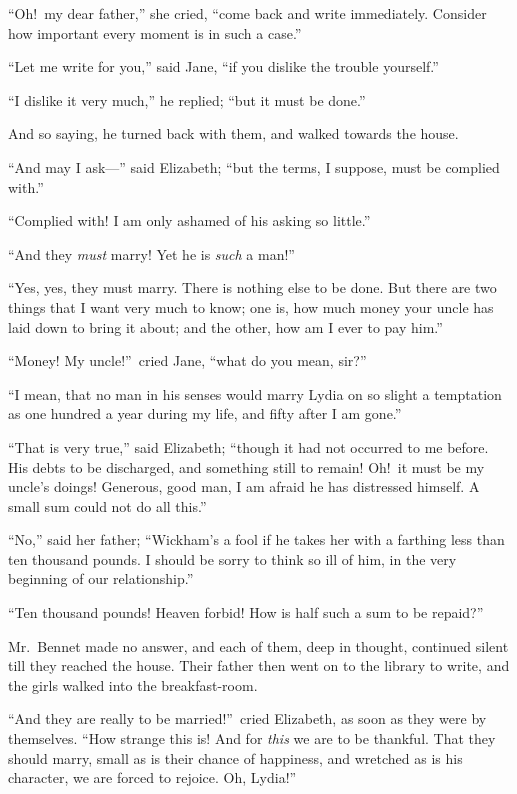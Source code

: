 \documentclass[12pt,english]{book}
\begin{document}
{}``Oh!\ my dear father,'' she cried, {}``come back and write
immediately. Consider how important every moment is in such a case.''

{}``Let me write for you,'' said Jane, {}``if you dislike the trouble
yourself.''

{}``I dislike it very much,'' he replied; {}``but it must be done.''

And so saying, he turned back with them, and walked towards the house.

{}``And may I ask\mbox{---}'' said Elizabeth; {}``but the terms,
I suppose, must be complied with.''

{}``Complied with! I am only ashamed of his asking so little.''

{}``And they \textit{must} marry! Yet he is \textit{such} a man!''\ 

{}``Yes, yes, they must marry. There is nothing else to be done.
But there are two things that I want very much to know; one is, how
much money your uncle has laid down to bring it about; and the other,
how am I ever to pay him.''

{}``Money! My uncle!''\ cried Jane, {}``what do you mean, sir?''\ 

{}``I mean, that no man in his senses would marry Lydia on so slight
a temptation as one hundred a year during my life, and fifty after
I am gone.''

{}``That is very true,'' said Elizabeth; {}``though it had not
occurred to me before. His debts to be discharged, and something still
to remain! Oh!\ it must be my uncle's doings! Generous, good man,
I am afraid he has distressed himself. A small sum could not do all
this.''

{}``No,'' said her father; {}``Wickham's a fool if he takes her
with a farthing less than ten thousand pounds. I should be sorry to
think so ill of him, in the very beginning of our relationship.''

{}``Ten thousand pounds! Heaven forbid! How is half such a sum to
be repaid?''\ 

Mr.\ Bennet made no answer, and each of them, deep in thought, continued
silent till they reached the house. Their father then went on to the
library to write, and the girls walked into the breakfast-room.

{}``And they are really to be married!''\ cried Elizabeth, as soon
as they were by themselves. {}``How strange this is! And for \textit{this}
we are to be thankful. That they should marry, small as is their chance
of happiness, and wretched as is his character, we are forced to rejoice.
Oh, Lydia!''\ 
\end{document}
